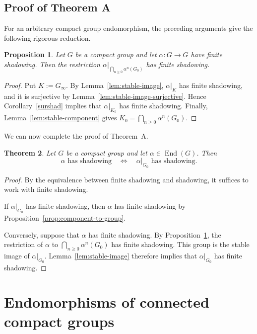 \documentclass[12pt]{amsart}
\newtheorem{theorem}{Theorem}[section]
\newtheorem{proposition}[theorem]{Proposition}
\theoremstyle{definition}
\numberwithin{equation}{section}
\theoremstyle{remark}
\def\End{\operatorname{End}}
\begin{document}
\subsection{Proof of Theorem A}

For an arbitrary compact group endomorphism, the preceding arguments
give the following rigorous reduction.

\begin{proposition}\label{prop:general-reduction}
Let $G$ be a compact group and let $\alpha:G\to G$ have finite
shadowing. 
Then the restriction
$
\alpha\big|_{\bigcap_{n\geq 0}\alpha^n(G_0)}
$
has finite shadowing.
\end{proposition}

\begin{proof}
	Put $K:=G_\infty$. By Lemma~\ref{lem:stable-image},
	$\alpha|_K$ has finite shadowing, and it is surjective by
	Lemma~\ref{lem:stable-image-surjective}. Hence
Corollary~\ref{surshad} implies that
$\alpha|_{K_0}$ has finite shadowing. Finally,
Lemma~\ref{lem:stable-component} gives
$
K_0=\bigcap_{n\geq 0}\alpha^n(G_0).
$
\end{proof}

We can now complete the proof of Theorem~A.



\begin{theorem}\label{thmA}
 Let $G$ be a compact group and let
$\alpha\in \End(G)$. Then
\[
\alpha\text{ has shadowing}
\quad\Longleftrightarrow\quad
\alpha|_{G_0}\text{ has shadowing}.
\]
\end{theorem}

\begin{proof}
By the equivalence between finite shadowing and shadowing, it suffices
to work with finite shadowing.

If $\alpha|_{G_0}$ has finite shadowing, then $\alpha$ has finite
shadowing by Proposition~\ref{prop:component-to-group}.

Conversely, suppose that $\alpha$ has finite shadowing. By
Proposition~\ref{prop:general-reduction}, the restriction of $\alpha$
to
$
\bigcap_{n\geq 0}\alpha^n(G_0)
$
has finite shadowing. This group is the stable image of
$\alpha|_{G_0}$. Lemma~\ref{lem:stable-image} therefore implies
that $\alpha|_{G_0}$ has finite shadowing.
\end{proof}




\section{Endomorphisms of connected compact groups}\label{thBC}
\end{document}
